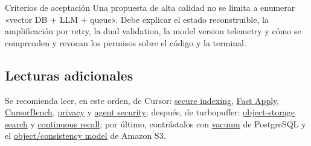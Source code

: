 \begin{knowledgebox}{Criterios de aceptación}
Una propuesta de alta calidad no se limita a enumerar «vector DB + LLM + queue». Debe explicar el estado reconstruible, la amplificación por retry, la dual validation, la model version telemetry y cómo se comprenden y revocan los permisos sobre el código y la terminal.
\end{knowledgebox}

\subsection{Lecturas adicionales}

Se recomienda leer, en este orden, de Cursor: \href{https://cursor.com/blog/secure-codebase-indexing}{secure indexing}, \href{https://cursor.com/blog/instant-apply}{Fast Apply}, \href{https://cursor.com/blog/cursorbench}{CursorBench}, \href{https://cursor.com/docs/enterprise/privacy-and-data-governance}{privacy} y \href{https://cursor.com/docs/agent/security}{agent security}; después, de turbopuffer: \href{https://turbopuffer.com/blog/turbopuffer}{object-storage search} y \href{https://turbopuffer.com/blog/continuous-recall}{continuous recall}; por último, contrástalos con \href{https://www.postgresql.org/docs/current/routine-vacuuming.html}{vacuum} de PostgreSQL y el \href{https://docs.aws.amazon.com/AmazonS3/latest/userguide/Welcome.html}{object/consistency model} de Amazon S3.


